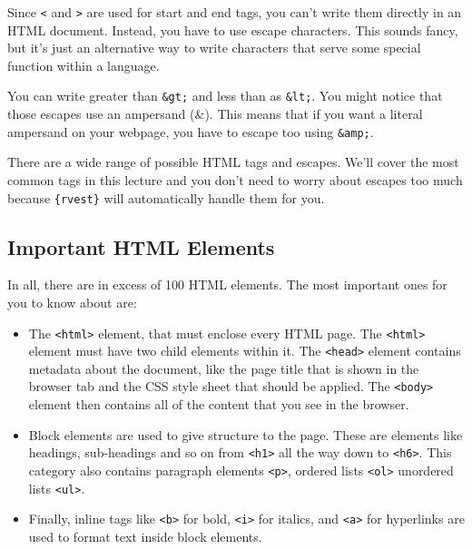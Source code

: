 \documentclass[
  letterpaper,
  DIV=11,
  numbers=noendperiod]{scrreprt}
\begin{document}
Since \texttt{\textless{}} and \texttt{\textgreater{}} are used for
start and end tags, you can't write them directly in an HTML document.
Instead, you have to use escape characters. This sounds fancy, but it's
just an alternative way to write characters that serve some special
function within a language.

You can write greater than \texttt{\&gt;} and less than as
\texttt{\&lt;}. You might notice that those escapes use an ampersand
(\&). This means that if you want a literal ampersand on your webpage,
you have to escape too using \texttt{\&amp;}.

There are a wide range of possible HTML tags and escapes. We'll cover
the most common tags in this lecture and you don't need to worry about
escapes too much because \texttt{\{rvest\}} will automatically handle
them for you.

\subsection{Important HTML Elements}\label{important-html-elements}

In all, there are in excess of 100 HTML elements. The most important
ones for you to know about are:

\begin{itemize}
\item
  The \texttt{\textless{}html\textgreater{}} element, that must enclose
  every HTML page. The \texttt{\textless{}html\textgreater{}} element
  must have two child elements within it. The
  \texttt{\textless{}head\textgreater{}} element contains metadata about
  the document, like the page title that is shown in the browser tab and
  the CSS style sheet that should be applied. The
  \texttt{\textless{}body\textgreater{}} element then contains all of
  the content that you see in the browser.
\item
  Block elements are used to give structure to the page. These are
  elements like headings, sub-headings and so on from
  \texttt{\textless{}h1\textgreater{}} all the way down to
  \texttt{\textless{}h6\textgreater{}}. This category also contains
  paragraph elements \texttt{\textless{}p\textgreater{}}, ordered lists
  \texttt{\textless{}ol\textgreater{}} unordered lists
  \texttt{\textless{}ul\textgreater{}}.
\item
  Finally, inline tags like \texttt{\textless{}b\textgreater{}} for
  bold, \texttt{\textless{}i\textgreater{}} for italics, and
  \texttt{\textless{}a\textgreater{}} for hyperlinks are used to format
  text inside block elements.
\end{itemize}
\end{document}
